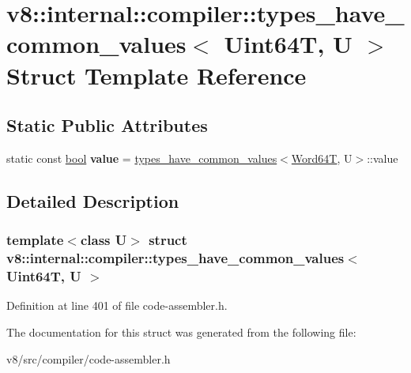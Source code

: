 \hypertarget{structv8_1_1internal_1_1compiler_1_1types__have__common__values_3_01Uint64T_00_01U_01_4}{}\section{v8\+:\+:internal\+:\+:compiler\+:\+:types\+\_\+have\+\_\+common\+\_\+values$<$ Uint64T, U $>$ Struct Template Reference}
\label{structv8_1_1internal_1_1compiler_1_1types__have__common__values_3_01Uint64T_00_01U_01_4}
\subsection*{Static Public Attributes}
\begin{DoxyCompactItemize}
\item 
\mbox{\label{structv8_1_1internal_1_1compiler_1_1types__have__common__values_3_01Uint64T_00_01U_01_4_adb6e4a84105172fa65a43b0a230c2ac8}} 
static const \mbox{\hyperlink{classbool}{bool}} {\bfseries value} = \mbox{\hyperlink{structv8_1_1internal_1_1compiler_1_1types__have__common__values}{types\+\_\+have\+\_\+common\+\_\+values}}$<$\mbox{\hyperlink{structv8_1_1internal_1_1Word64T}{Word64T}}, U$>$\+::value
\end{DoxyCompactItemize}


\subsection{Detailed Description}
\subsubsection*{template$<$class U$>$\newline
struct v8\+::internal\+::compiler\+::types\+\_\+have\+\_\+common\+\_\+values$<$ Uint64\+T, U $>$}



Definition at line 401 of file code-\/assembler.\+h.



The documentation for this struct was generated from the following file\+:\begin{DoxyCompactItemize}
\item 
v8/src/compiler/code-\/assembler.\+h\end{DoxyCompactItemize}

